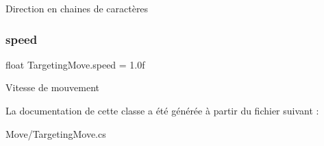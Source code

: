 Direction en chaines de caractères 

\mbox{\label{class_targeting_move_a18c74fa8724c7faec50dae67ad7b527d}} 
\subsubsection{\texorpdfstring{speed}{speed}}
{\footnotesize\ttfamily float Targeting\+Move.\+speed = 1.\+0f}



Vitesse de mouvement 



La documentation de cette classe a été générée à partir du fichier suivant \+:\begin{DoxyCompactItemize}
\item 
Move/Targeting\+Move.\+cs\end{DoxyCompactItemize}
